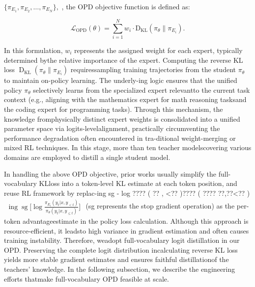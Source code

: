 \documentclass[
  10
]{article}
\begin{document}
\(\{ \pi _ { E _ { 1 } } , \pi _ { E _ { 2 } } , \ldots , \pi _ { E _ { N } } \} ,\)
, the OPD objective function is defined as:

\[
\mathcal {L} _ {\mathrm {O P D}} (\theta) = \sum_ {i = 1} ^ {N} w _ {i} \cdot \mathrm {D} _ {\mathrm {K L}} \left(\pi_ {\theta} \| \pi_ {E _ {i}}\right). \tag {29}
\]

In this formulation, \(w _ { i }\) represents the assigned weight for
each expert, typically determined bythe relative importance of the
expert. Computing the reverse KL loss
\(\operatorname { D } _ { \mathrm { K L } } \left( \pi _ { \theta } \parallel \pi _ { E _ { i } } \right)\)
requiressampling training trajectories from the student
\(\pi _ { \theta }\) to maintain on-policy learning. The underly-ing
logic ensures that the unified policy \(\pi _ { \theta }\) selectively
learns from the specialized expert relevantto the current task context
(e.g., aligning with the mathematics expert for math reasoning tasksand
the coding expert for programming tasks). Through this mechanism, the
knowledge fromphysically distinct expert weights is consolidated into a
unified parameter space via logits-levelalignment, practically
circumventing the performance degradation often encountered in
tra-ditional weight-merging or mixed RL techniques. In this stage, more
than ten teacher modelscovering various domains are employed to distill
a single student model.

In handling the above OPD objective, prior works usually simplify the
full-vocabulary KLloss into a token-level KL estimate at each token
position, and reuse RL framework by replac-ing sg - log ???? ( ??
\textbar{} , \textless?? )???? ( ???? \textbar{} ??,??\textless?? )
\(\begin{array} { r } { \operatorname* { i n g } \operatorname { s g } \bigl [ \log \frac { \pi _ { E _ { i } } ( y _ { t } | x , y _ { < t } ) } { \pi _ { \theta } ( y _ { t } | x , y _ { \le t } ) } \bigr ] } \end{array}\)
(sg represents the stop gradient operation) as the per-token
advantageestimate in the policy loss calculation. Although this approach
is resource-efficient, it leadsto high variance in gradient estimation
and often causes training instability. Therefore, weadopt
full-vocabulary logit distillation in our OPD. Preserving the complete
logit distribution incalculating reverse KL loss yields more stable
gradient estimates and ensures faithful distillationof the teachers'
knowledge. In the following subsection, we describe the engineering
efforts thatmake full-vocabulary OPD feasible at scale.
\end{document}
